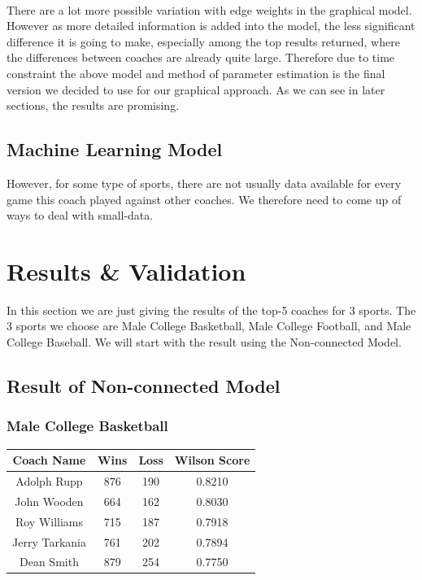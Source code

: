 \documentclass[titlepage]{article}
\begin{document}
\noindent 
\\

\noindent There are a lot more possible variation with edge weights in the graphical model. However as more detailed information is added into the model, the less significant difference it is going to make, especially among the top results returned, where the differences between coaches are already quite large. Therefore due to time constraint the above model and method of parameter estimation is the final version we decided to use for our graphical approach. As we can see in later sections, the results are promising.

\subsection{Machine Learning Model}

However, for some type of sports, there are not usually data available for every game this coach played against other coaches. We therefore need to come up of ways to deal with small-data.

\section{Results \& Validation}

In this section we are just giving the results of the top-5 coaches for 3 sports. The 3 sports we choose are Male College Basketball, Male College Football, and Male College Baseball. We will start with the result using the Non-connected Model.

\subsection{Result of Non-connected Model}

\subsubsection*{Male College Basketball}

\begin{center}
\begin{tabular}{ | c | c | c| c |}
\hline
Coach Name       & Wins  & Loss & Wilson Score \\\hline
Adolph Rupp      & 876   & 190  & 0.8210 \\\hline
John Wooden      & 664   & 162  & 0.8030 \\\hline
Roy Williams     & 715   & 187  & 0.7918 \\\hline
Jerry Tarkania   & 761   & 202  & 0.7894 \\\hline
Dean Smith       & 879   & 254  & 0.7750 \\
\hline
\end{tabular}
\end{center}
\end{document}
